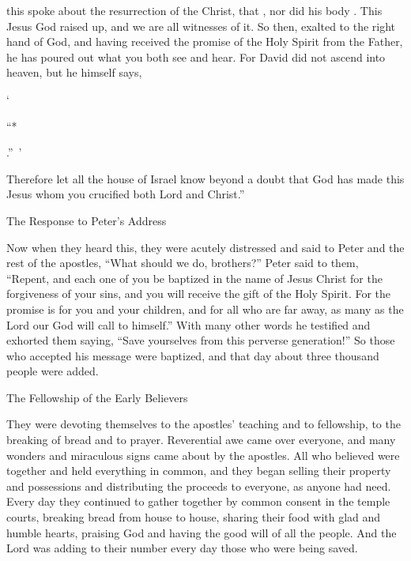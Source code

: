 {this spoke
about
the resurrection
of the Christ,
that
{}, nor
did his
body
{}
{}.
This
Jesus
God
raised up,
and we
are
all
witnesses of it.
So then,
exalted
to the right hand
of God,
and
having received
the promise
of the Holy
Spirit
from
the Father,
he has poured out
what
you
both
see
and
hear.
For
David
did
not
ascend
into
heaven,
but
he
himself
says,
\par }{\Q ‘{}
\par }{\Q “{}*
\par }{\Q {}.” ’
\par }{\PI {}Therefore
let all
the house
of Israel
know
beyond a doubt
that
God
has made
this
Jesus
whom
you
crucified
both
Lord
and
Christ.”
\par }{\SH The Response to Peter’s Address
\par }{\PP {}Now when
they heard
this, they were acutely distressed
and said
to
Peter
and
the rest
of the apostles,
“What
should we do,
brothers?”
Peter
said to
them,
“Repent,
and
each one
of you
be baptized
in
the name
of Jesus
Christ
for
the forgiveness
of your
sins,
and
you will receive
the gift
of the Holy
Spirit.
For
the promise
is
for you
and
your
children,
and
for all
who are far away,
as many as
the Lord
our
God
will call to himself.”
With many
other
words
he testified
and
exhorted
them
saying,
“Save yourselves
from
this
perverse
generation!”
So
those who accepted
his
message
were baptized,
and
that
day
about
three thousand
people
were added.
\par }{\SH The Fellowship of the Early Believers
\par }{\PP {}They were
devoting
themselves to the apostles’
teaching
and
to fellowship,
to the breaking
of bread
and
to prayer.
Reverential awe
came over
everyone,
and many
wonders
and
miraculous signs
came about
by
the apostles.
All
who believed
were together and held everything
in common,
and
they began selling
their property
and
possessions
and
distributing
the proceeds to everyone,
as
anyone
had
need.
Every
day
they continued
to gather together by common consent
in
the temple courts,
breaking
bread
from house to house,
sharing
their food
with
glad
and
humble
hearts,
praising
God
and
having
the good will
of all
the people.
And
the Lord
was adding
to
their number
every
day
those who were being saved.

}
